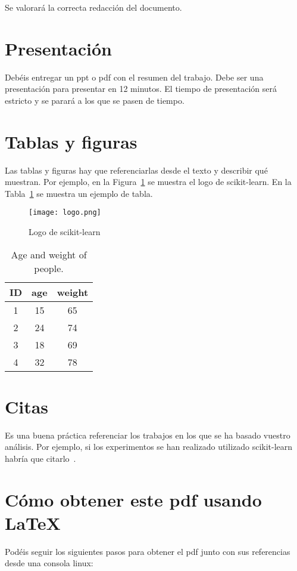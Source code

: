 \documentclass{esannV2}
\begin{document}
Se valorará la correcta redacción del documento.

\section{Presentación}
Debéis entregar un ppt o pdf con el resumen del trabajo. Debe ser una
presentación para presentar en 12 minutos. El tiempo de presentación será
estricto y se parará a los que se pasen de tiempo.

\section{Tablas y figuras}
Las tablas y figuras hay que referenciarlas desde el texto y describir qué
muestran. Por ejemplo, en la Figura~\ref{fig:logo} se muestra el logo de
scikit-learn. En la Tabla~\ref{tab:ageweight} se muestra un ejemplo de tabla.


\begin{figure}[b!]
\centering
\texttt{[image: logo.png]}
\caption{Logo de scikit-learn}\label{fig:logo}
\end{figure}

\begin{table}[t!]
  \centering
  \begin{tabular}{|c|c|c|}
    \hline
    ID & age & weight \\
    \hline
    1& 15 & 65 \\
    2& 24 & 74\\
    3& 18 & 69 \\
    4& 32 & 78 \\
    \hline
  \end{tabular}
  \caption{Age and weight of people.}\label{tab:ageweight}
\end{table}

\section{Citas}
Es una buena práctica referenciar los trabajos en los que se ha basado vuestro
análisis. Por ejemplo, si los experimentos se han realizado utilizado
scikit-learn habría que citarlo~\cite{scikit-learn}.

\section{Cómo obtener este pdf usando \LaTeX}
Podéis seguir los siguientes pasos para obtener el pdf junto con sus
referencias desde una consola linux:
\end{document}
